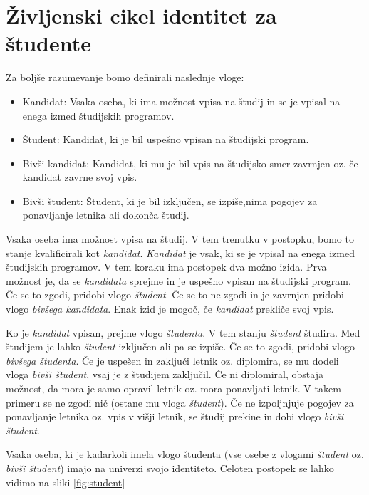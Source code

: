 \documentclass[a4paper,12pt,openright]{book}
\begin{document}
\section{Življenski cikel identitet za študente}

Za boljše razumevanje bomo definirali naslednje vloge:
\begin{itemize}
    \item Kandidat: Vsaka oseba, ki ima možnost vpisa na študij in se je vpisal na enega izmed študijskih programov.
    \item Študent: Kandidat, ki je bil uspešno vpisan na študijski program. 
    \item Bivši kandidat: Kandidat, ki mu je bil vpis na študijsko smer zavrnjen oz. če kandidat zavrne svoj vpis.
    \item Bivši študent: Študent, ki je bil izključen, se izpiše,nima pogojev za ponavljanje letnika ali dokonča študij.
    
\end{itemize}

Vsaka oseba ima možnost vpisa na študij. V tem trenutku v postopku, bomo to stanje kvalificirali kot \emph{kandidat}. \emph{Kandidat}  je vsak, ki se je vpisal na enega izmed študijskih programov. V tem koraku ima postopek dva možno izida. Prva možnost je, da se \emph{kandidata} sprejme in je uspešno vpisan na študijski program. Če se to zgodi, pridobi vlogo \emph{študent}. Če se to ne zgodi in je zavrnjen pridobi vlogo \emph{ bivšega kandidata}. Enak izid je mogoč, če \emph{kandidat} prekliče svoj vpis. \newline

Ko je \emph{kandidat} vpisan, prejme vlogo \emph{študenta}. V tem stanju \emph{študent} študira. Med študijem je lahko \emph{študent} izključen ali pa se izpiše. Če se to zgodi, pridobi vlogo \emph{bivšega študenta}. Če je uspešen in zaključi letnik oz. diplomira, se mu dodeli vloga \emph{bivši študent}, vsaj je z študijem zaključil. Če ni diplomiral, obstaja možnost, da mora je samo opravil letnik oz. mora ponavljati letnik. V takem primeru se ne zgodi nič (ostane mu vloga \emph{študent}). Če ne izpoljnjuje pogojev za ponavljanje letnika oz. vpis v višji letnik, se študij prekine in dobi vlogo \emph{bivši študent}.

Vsaka oseba, ki je kadarkoli imela vlogo študenta (vse osebe z vlogami \emph{študent} oz. \emph{bivši študent}) imajo na univerzi svojo identiteto. 
Celoten postopek se lahko vidimo na sliki \ref{fig:student}
\end{document}
